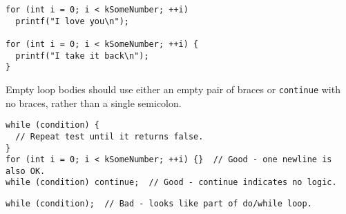 \begin{verbatim}
for (int i = 0; i < kSomeNumber; ++i)
  printf("I love you\n");

for (int i = 0; i < kSomeNumber; ++i) {
  printf("I take it back\n");
}
\end{verbatim}
Empty loop bodies should use either an empty pair of braces or \texttt{continue} with no braces, rather than a single semicolon.
\begin{verbatim}
while (condition) {
  // Repeat test until it returns false.
}
for (int i = 0; i < kSomeNumber; ++i) {}  // Good - one newline is also OK.
while (condition) continue;  // Good - continue indicates no logic.
\end{verbatim}
\begin{verbatim}
while (condition);  // Bad - looks like part of do/while loop.
\end{verbatim}
